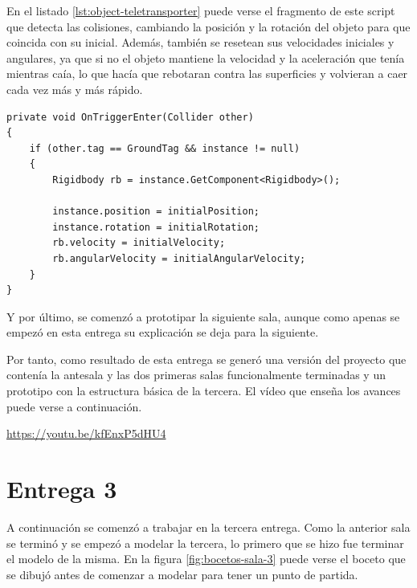 En el listado \ref{lst:object-teletransporter} puede verse el fragmento de este script que detecta las colisiones, cambiando la posición y la rotación del objeto para que coincida con su inicial. Además, también se resetean sus velocidades iniciales y angulares, ya que si no el objeto mantiene la velocidad y la aceleración que tenía mientras caía, lo que hacía que rebotaran contra las superficies y volvieran a caer cada vez más y más rápido.

\begin{lstlisting}[caption=Fragmento del script para teletransportar un objeto si toca el suelo, label=lst:object-teletransporter]
private void OnTriggerEnter(Collider other)
{
    if (other.tag == GroundTag && instance != null)
    {
        Rigidbody rb = instance.GetComponent<Rigidbody>();

        instance.position = initialPosition;
        instance.rotation = initialRotation;
        rb.velocity = initialVelocity;
        rb.angularVelocity = initialAngularVelocity;
    }
}
\end{lstlisting}


Y por último, se comenzó a prototipar la siguiente sala, aunque como apenas se empezó en esta entrega su explicación se deja para la siguiente.

Por tanto, como resultado de esta entrega se generó una versión del proyecto que contenía la antesala y las dos primeras salas funcionalmente terminadas y un prototipo con la estructura básica de la tercera. El vídeo que enseña los avances puede verse a continuación.

\begin{center}
    \url{https://youtu.be/kfEnxP5dHU4}
\end{center}



\section{Entrega 3}

A continuación se comenzó a trabajar en la tercera entrega. Como la anterior sala se terminó y se empezó a modelar la tercera, lo primero que se hizo fue terminar el modelo de la misma. En la figura \ref{fig:bocetos-sala-3} puede verse el boceto que se dibujó antes de comenzar a modelar para tener un punto de partida.

